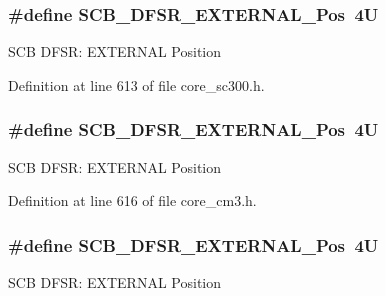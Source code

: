\subsubsection[{\texorpdfstring{S\+C\+B\+\_\+\+D\+F\+S\+R\+\_\+\+E\+X\+T\+E\+R\+N\+A\+L\+\_\+\+Pos}{SCB_DFSR_EXTERNAL_Pos}}]{\setlength{\rightskip}{0pt plus 5cm}\#define S\+C\+B\+\_\+\+D\+F\+S\+R\+\_\+\+E\+X\+T\+E\+R\+N\+A\+L\+\_\+\+Pos~4U}\hypertarget{group___c_m_s_i_s___s_c_b_ga13f502fb5ac673df9c287488c40b0c1d}{}\label{group___c_m_s_i_s___s_c_b_ga13f502fb5ac673df9c287488c40b0c1d}
S\+CB D\+F\+SR\+: E\+X\+T\+E\+R\+N\+AL Position 

Definition at line 613 of file core\+\_\+sc300.\+h.

\subsubsection[{\texorpdfstring{S\+C\+B\+\_\+\+D\+F\+S\+R\+\_\+\+E\+X\+T\+E\+R\+N\+A\+L\+\_\+\+Pos}{SCB_DFSR_EXTERNAL_Pos}}]{\setlength{\rightskip}{0pt plus 5cm}\#define S\+C\+B\+\_\+\+D\+F\+S\+R\+\_\+\+E\+X\+T\+E\+R\+N\+A\+L\+\_\+\+Pos~4U}\hypertarget{group___c_m_s_i_s___s_c_b_ga13f502fb5ac673df9c287488c40b0c1d}{}\label{group___c_m_s_i_s___s_c_b_ga13f502fb5ac673df9c287488c40b0c1d}
S\+CB D\+F\+SR\+: E\+X\+T\+E\+R\+N\+AL Position 

Definition at line 616 of file core\+\_\+cm3.\+h.

\subsubsection[{\texorpdfstring{S\+C\+B\+\_\+\+D\+F\+S\+R\+\_\+\+E\+X\+T\+E\+R\+N\+A\+L\+\_\+\+Pos}{SCB_DFSR_EXTERNAL_Pos}}]{\setlength{\rightskip}{0pt plus 5cm}\#define S\+C\+B\+\_\+\+D\+F\+S\+R\+\_\+\+E\+X\+T\+E\+R\+N\+A\+L\+\_\+\+Pos~4U}\hypertarget{group___c_m_s_i_s___s_c_b_ga13f502fb5ac673df9c287488c40b0c1d}{}\label{group___c_m_s_i_s___s_c_b_ga13f502fb5ac673df9c287488c40b0c1d}
S\+CB D\+F\+SR\+: E\+X\+T\+E\+R\+N\+AL Position 


